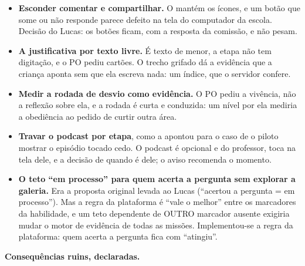 \begin{itemize}
  \item \textbf{Esconder comentar e compartilhar.} O 
    mantém os ícones, e um botão que some ou não responde parece defeito na
    tela do computador da escola. Decisão do Lucas: os botões ficam, com a
    resposta da comissão, e não pesam.
  \item \textbf{A justificativa por texto livre.} É texto de menor, a etapa
    não tem digitação, e o PO pediu cartões. O trecho grifado dá a evidência
    que a criança aponta sem que ela escreva nada: um índice, que o servidor
    confere.
  \item \textbf{Medir a rodada de desvio como evidência.} O PO pediu a
    vivência, não a reflexão sobre ela, e a rodada é curta e conduzida: um
    nível por ela mediria a obediência ao pedido de curtir outra área.
  \item \textbf{Travar o podcast por etapa}, como a  apontou
    para o caso de o piloto mostrar o episódio tocado cedo. O podcast é
    opcional e do professor, toca na tela dele, e a decisão de quando é dele;
    o aviso recomenda o momento.
  \item \textbf{O teto \enquote{em processo} para quem acerta a pergunta sem
    explorar a galeria.} Era a proposta original levada ao Lucas
    (\enquote{acertou a pergunta = em processo}). Mas a regra da plataforma é
    \enquote{vale o melhor} entre os marcadores da habilidade, e um teto
    dependente de OUTRO marcador ausente exigiria mudar o motor de evidência
    de todas as missões. Implementou-se a regra da plataforma: quem acerta a
    pergunta fica com \enquote{atingiu}.
\end{itemize}

\textbf{Consequências ruins, declaradas.}


